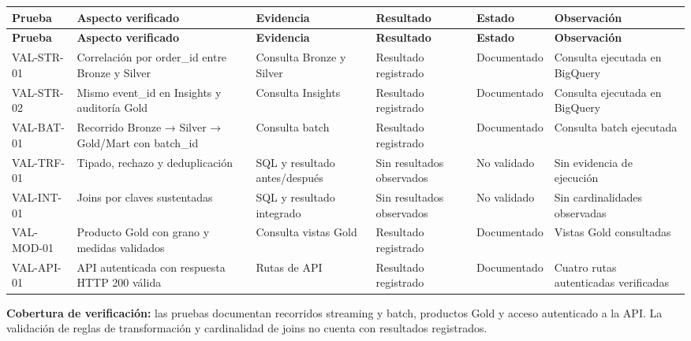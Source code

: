 \documentclass[11pt]{article}
\begin{document}
\begingroup\footnotesize
\begin{longtable}{@{}>{\raggedright\arraybackslash}p{}>{\raggedright\arraybackslash}p{}>{\raggedright\arraybackslash}p{}>{\raggedright\arraybackslash}p{}>{\raggedright\arraybackslash}p{}>{\raggedright\arraybackslash}p{}@{}}
\toprule
\textbf{Prueba} & \textbf{Aspecto verificado} & \textbf{Evidencia} & \textbf{Resultado} & \textbf{Estado} & \textbf{Observación} \\
\midrule
\endfirsthead
\toprule
\textbf{Prueba} & \textbf{Aspecto verificado} & \textbf{Evidencia} & \textbf{Resultado} & \textbf{Estado} & \textbf{Observación} \\
\midrule
\endhead
VAL-STR-01 & Correlación por order\_\allowbreak{}id entre Bronze y Silver & Consulta Bronze y Silver & Resultado registrado & Documentado & Consulta ejecutada en BigQuery \\
VAL-STR-02 & Mismo event\_\allowbreak{}id en Insights y auditoría Gold & Consulta Insights & Resultado registrado & Documentado & Consulta ejecutada en BigQuery \\
VAL-BAT-01 & Recorrido Bronze → Silver → Gold/\allowbreak{}Mart con batch\_\allowbreak{}id & Consulta batch & Resultado registrado & Documentado & Consulta batch ejecutada \\
VAL-TRF-01 & Tipado, rechazo y deduplicación & SQL y resultado antes/\allowbreak{}después & Sin resultados observados & No validado & Sin evidencia de ejecución \\
VAL-INT-01 & Joins por claves sustentadas & SQL y resultado integrado & Sin resultados observados & No validado & Sin cardinalidades observadas \\
VAL-MOD-01 & Producto Gold con grano y medidas validados & Consulta vistas Gold & Resultado registrado & Documentado & Vistas Gold consultadas \\
VAL-API-01 & API autenticada con respuesta HTTP 200 válida & Rutas de API & Resultado registrado & Documentado & Cuatro rutas autenticadas verificadas \\
\bottomrule
\end{longtable}
\endgroup

\textbf{Cobertura de verificación:} las pruebas documentan recorridos streaming y batch, productos Gold y acceso autenticado a la API. La validación de reglas de transformación y cardinalidad de joins no cuenta con resultados registrados.\par
\end{document}
